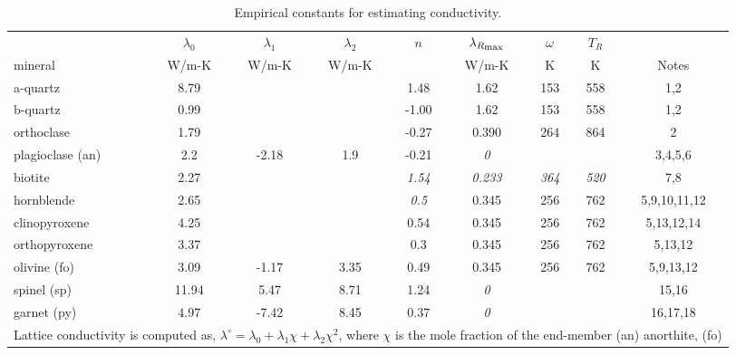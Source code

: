 \begin{table}
    \caption{Empirical constants for estimating conductivity.}
    \label{tab-conduct}
    \begin{tabular}{@{}lcccccccc@{}}
      \toprule
        {} &
        $\lambda_{0}$ & $\lambda_{1}$ & $\lambda_{2}$ & $n$ &
        $\lambda_{R_{\mbox{\scriptsize{max}}}}$ & $\omega$ & $T_{R}$ &
        {} \\
        mineral &
        W/m-K & W/m-K & W/m-K & {} &
        W/m-K  & K & K &
        Notes \\
      \midrule
        a-quartz         &  8.79 &  {}    & {}   &  1.48       & 1.62        & 153       &  558       & 1,2 \\ 
        b-quartz         &  0.99 &  {}    & {}   & -1.00       & 1.62        & 153       &  558       & 1,2 \\ 
        orthoclase       &  1.79 &  {}    & {}   & -0.27       & 0.390       & 264       &  864       & 2 \\ 
        plagioclase (an) &  2.2  & -2.18  & 1.9  & -0.21       & {\it 0}     &   {}      &   {}       & 3,4,5,6 \\ 
        biotite          &  2.27 &  {}    & {}   &  {\it 1.54} & {\it 0.233} & {\it 364} &  {\it 520} & 7,8 \\ 
        hornblende       &  2.65 &  {}    & {}   &  {\it 0.5}  & 0.345       & 256       &  762       & 5,9,10,11,12 \\ 
        clinopyroxene    &  4.25 &  {}    & {}   &  0.54       & 0.345       & 256       &  762       & 5,13,12,14 \\ 
        orthopyroxene    &  3.37 &  {}    & {}   &  0.3        & 0.345       & 256       &  762       & 5,13,12 \\ 
        olivine (fo)     &  3.09 & -1.17  & 3.35 &  0.49       & 0.345       & 256       &  762       & 5,9,13,12 \\ 
        spinel (sp)      & 11.94 &  5.47  & 8.71 &  1.24       & {\it 0}     &   {}      &   {}       & 15,16 \\ 
        garnet (py)      &  4.97 & -7.42  & 8.45 &  0.37       & {\it 0}     &   {}      &   {}       & 16,17,18 \\ 
      \bottomrule
      \multicolumn{9}{p{0.98\textwidth}}{
        Lattice conductivity is computed as, $\lambda^{\circ} =
        \lambda_{0} + \lambda_{1}\chi + \lambda_{2}\chi^{2}$, where $\chi$
        is the mole fraction of the end-member (an) anorthite, (fo)
}
\end{tabular}
\end{table}
